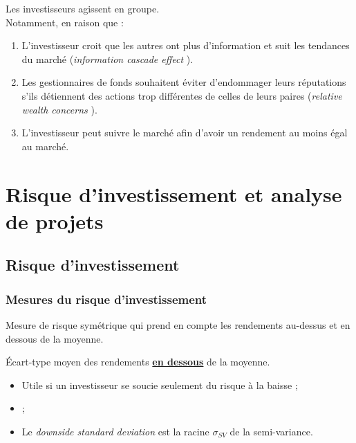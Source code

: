 \documentclass[10pt, french]{article}
\begin{document}
\begin{multicols*}{2}
\begin{definitionNOHFILLsub}
Les investisseurs agissent en groupe.	\\

Notamment, en raison que :
\begin{enumerate}
	\item	L'investisseur croit que les autres ont plus d'information et suit les tendances du marché (\og \textit{information cascade effect} \fg{}).
	\item	Les gestionnaires de fonds souhaitent éviter d'endommager leurs réputations s'ils détiennent des actions trop différentes de celles de leurs paires (\og \textit{relative wealth concerns} \fg{}).
	\item	L'investisseur peut suivre le marché afin d'avoir un rendement au moins égal au marché.
\end{enumerate}
\end{definitionNOHFILLsub}


\pagebreak
\section{Risque d'investissement et analyse de projets}
\subsection{Risque d'investissement}
\subsubsection{Mesures du risque d'investissement}
\begin{definitionNOHFILL}[Variance]
Mesure de risque symétrique qui prend en compte les rendements au-dessus et en dessous de la moyenne.
\end{definitionNOHFILL}

\begin{definitionNOHFILL}
Écart-type moyen des rendements \underline{\textbf{en dessous}} de la moyenne.

\begin{itemize}
		\item	Utile si un investisseur se soucie seulement du risque à la baisse ;
		\item	{} ;
		\item	Le \og \textit{downside standard deviation} \fg{} est la racine $\sigma_{SV}$ de la semi-variance.
		\end{itemize}
\end{definitionNOHFILL}


\end{multicols*}
\end{document}

